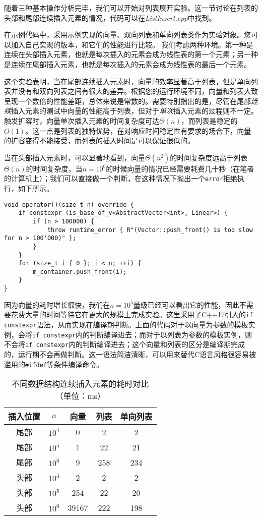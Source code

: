 随着三种基本操作分析完毕，我们可以开始对列表展开实验。这一节讨论在列表的头部和尾部连续插入元素的情况，代码可以在\textit{ListInsert.cpp}中找到。

在示例代码中，采用示例实现的向量、双向列表和单向列表类作为实验对象。您可以加入自己实现的版本，和它们的性能进行比较。
我们考虑两种环境。第一种是连续在头部插入元素，也就是每次插入的元素会成为线性表的第一个元素；另一种是连续在尾部插入元素，也就是每次插入的元素会成为线性表的最后一个元素。

这个实验表明，当在尾部连续插入元素时，向量的效率显著高于列表，但是单向列表并没有和双向列表之间有很大的差异。根据您的运行环境不同，向量和列表大致呈现一个数倍的性能差距，总体来说是常数的。需要特别指出的是，尽管在尾部\textit{连续}插入元素的测试中向量的性能高于列表，但对于\textit{单次}插入元素的过程则不一定。触发扩容时，向量单次插入元素的时间复杂度可达$\Theta(n)$，而列表是稳定的$O(1)$。这一点是列表的独特优势，在对响应时间稳定性有要求的场合下，向量的扩容变得不能接受，而列表的插入时间是可以保证很低的。

当在头部插入元素时，可以显著地看到，向量$\Theta(n^2)$的时间复杂度远高于列表$\Theta(n)$的时间复杂度，当$n=10^6$的时候向量的情况已经需要耗费几十秒（在笔者的计算机上）；我们可以直接做一个判断，在这种情况下抛出一个\lstinline{error}拒绝执行，如下所示。

\begin{lstlisting}
void operator()(size_t n) override {
    if constexpr (is_base_of_v<AbstractVector<int>, Linear>) {
        if (n > 100000) {
            throw runtime_error { R"(Vector::push_front() is too slow for n > 100'000)" };
        }
    }
    for (size_t i { 0 }; i < n; ++i) {
        m_container.push_front(i);
    }
}
\end{lstlisting}

因为向量的耗时增长很快，我们在$n=10^5$量级已经可以看出它的性能，因此不需要花费大量的时间等待它在更大的规模上完成实验。这里采用了C++17引入的\lstinline{if constexpr}语法，从而实现在编译期判断。上面的代码对于以向量为参数的模板实例，会将\lstinline{if constexpr}内的判断编译进去；而对于以列表为参数的模板实例，则不会将\lstinline{if constexpr}内的判断编译进去；这个向量和列表的区分是编译期完成的，运行期不会再做判断。这一语法简洁清晰，可以用来替代C语言风格很容易被滥用的\lstinline{#ifdef}等条件编译命令。

\begin{table}
  \centering
  \caption{不同数据结构连续插入元素的耗时对比（单位：ms）}
  \begin{tabular}{cc|ccc}
    \toprule
    插入位置 & $n$ & 向量 & 列表 & 单向列表  
      \\
    \midrule
    尾部 & $10^4$ & 0 & 2 & 2 \\
    尾部 & $10^5$ & 1 & 22 & 21 \\
    尾部 & $10^6$ & 9 & 258 & 234 \\
    \midrule
    头部 & $10^4$ & 2 & 2 & 2 \\
    头部 & $10^5$ & 254 & 22 & 20 \\
    头部 & $10^6$ & 39167 & 222 & 198 \\
    \bottomrule
  \end{tabular}
  \label{tab:lis1}
\end{table}

